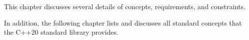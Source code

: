 This chapter discusses several details of concepts, requirements, and constraints.

In addition, the following chapter lists and discusses all standard concepts that the C++20 standard library provides.
